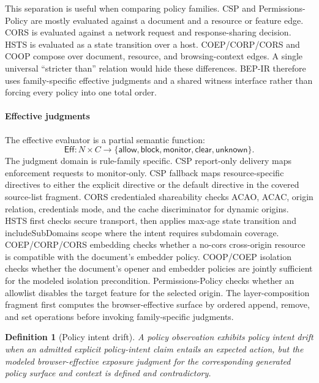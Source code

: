 \documentclass[10pt,conference]{IEEEtran}
\newtheorem{definition}{Definition}
\newcommand{\bep}{BEP-IR}
\newcommand{\unknown}{\mathsf{unknown}}
\newcommand{\allow}{\mathsf{allow}}
\newcommand{\block}{\mathsf{block}}
\newcommand{\monitor}{\mathsf{monitor}}
\newcommand{\clear}{\mathsf{clear}}
\begin{document}
This separation is useful when comparing policy families. CSP and Permissions-Policy are mostly evaluated against a document and a resource or feature edge. CORS is evaluated against a network request and response-sharing decision. HSTS is evaluated as a state transition over a host. COEP/CORP/CORS and COOP compose over document, resource, and browsing-context edges. A single universal ``stricter than'' relation would hide these differences. \bep{} therefore uses family-specific effective judgments and a shared witness interface rather than forcing every policy into one total order.

\paragraph{Effective judgments}

The effective evaluator is a partial semantic function:
\[
  \mathsf{Eff}: N \times C \rightarrow \{\allow,\block,\monitor,\clear,\unknown\}.
\]
The judgment domain is rule-family specific. CSP report-only delivery maps enforcement requests to monitor-only. CSP fallback maps resource-specific directives to either the explicit directive or the default directive in the covered source-list fragment. CORS credentialed shareability checks ACAO, ACAC, origin relation, credentials mode, and the cache discriminator for dynamic origins. HSTS first checks secure transport, then applies max-age state transition and includeSubDomains scope where the intent requires subdomain coverage. COEP/CORP/CORS embedding checks whether a no-cors cross-origin resource is compatible with the document's embedder policy. COOP/COEP isolation checks whether the document's opener and embedder policies are jointly sufficient for the modeled isolation precondition. Permissions-Policy checks whether an allowlist disables the target feature for the selected origin. The layer-composition fragment first computes the browser-effective surface by ordered append, remove, and set operations before invoking family-specific judgments.



\begin{definition}[Policy intent drift]
A policy observation exhibits policy intent drift when an admitted explicit policy-intent claim entails an expected action, but the modeled browser-effective exposure judgment for the corresponding generated policy surface and context is defined and contradictory.
\end{definition}
\end{document}
